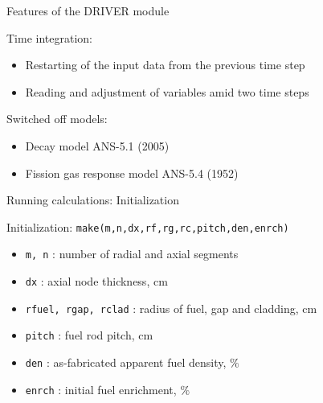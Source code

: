 \documentclass[11pt]{beamer}
\begin{document}
\begin{frame}{Features of the DRIVER module}
  \footnotesize

  \begin{block}{Time integration:}
  \begin{itemize}
    \item Restarting of the input data from the previous time step
    \item Reading and adjustment of variables amid two time steps
  \end{itemize}
  \end{block}

  \begin{block}{Switched off models:}
  \begin{itemize}
    \item Decay model ANS-5.1 (2005)
    \item Fission gas response model ANS-5.4 (1952)
  \end{itemize}
  \end{block}

\end{frame}


\begin{frame}{Running calculations: Initialization}
  
  \footnotesize

  \begin{block}{Initialization: \texttt{make(m,n,dx,rf,rg,rc,pitch,den,enrch)}}
    \begin{itemize}
    \item \texttt{m, n} : number of radial and axial segments
    \item \texttt{dx} : axial node thickness, cm
    \item \texttt{rfuel, rgap, rclad} : radius of fuel, gap and cladding, cm
    \item \texttt{pitch} : fuel rod pitch, cm
    \item \texttt{den} : as-fabricated apparent fuel density, $\%$
    \item \texttt{enrch} : initial fuel enrichment, $\%$
    \end{itemize}
  \end{block}

\end{frame}
\end{document}
